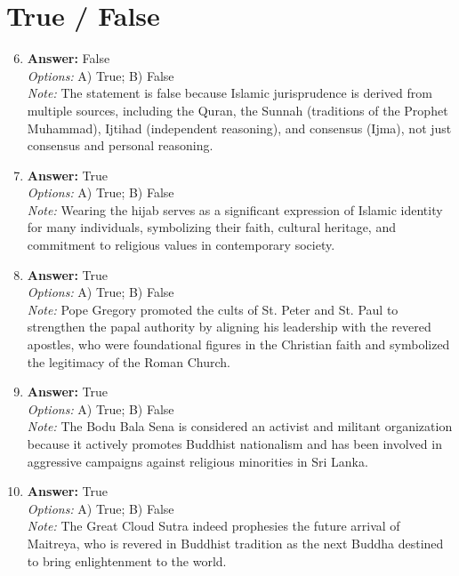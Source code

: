 \documentclass[12pt]{article}
\begin{document}
\section*{True / False}
\begin{enumerate}[label=\arabic*.]
\setcounter{enumi}{5}
\item \textbf{Answer:} False
\\ \textit{Options:} A) True; B) False
\\ \textit{Note:} The statement is false because Islamic jurisprudence is derived from multiple sources, including the Quran, the Sunnah (traditions of the Prophet Muhammad), Ijtihad (independent reasoning), and consensus (Ijma), not just consensus and personal reasoning.
\item \textbf{Answer:} True
\\ \textit{Options:} A) True; B) False
\\ \textit{Note:} Wearing the hijab serves as a significant expression of Islamic identity for many individuals, symbolizing their faith, cultural heritage, and commitment to religious values in contemporary society.
\item \textbf{Answer:} True
\\ \textit{Options:} A) True; B) False
\\ \textit{Note:} Pope Gregory promoted the cults of St. Peter and St. Paul to strengthen the papal authority by aligning his leadership with the revered apostles, who were foundational figures in the Christian faith and symbolized the legitimacy of the Roman Church.
\item \textbf{Answer:} True
\\ \textit{Options:} A) True; B) False
\\ \textit{Note:} The Bodu Bala Sena is considered an activist and militant organization because it actively promotes Buddhist nationalism and has been involved in aggressive campaigns against religious minorities in Sri Lanka.
\item \textbf{Answer:} True
\\ \textit{Options:} A) True; B) False
\\ \textit{Note:} The Great Cloud Sutra indeed prophesies the future arrival of Maitreya, who is revered in Buddhist tradition as the next Buddha destined to bring enlightenment to the world.
\end{enumerate}
\end{document}
